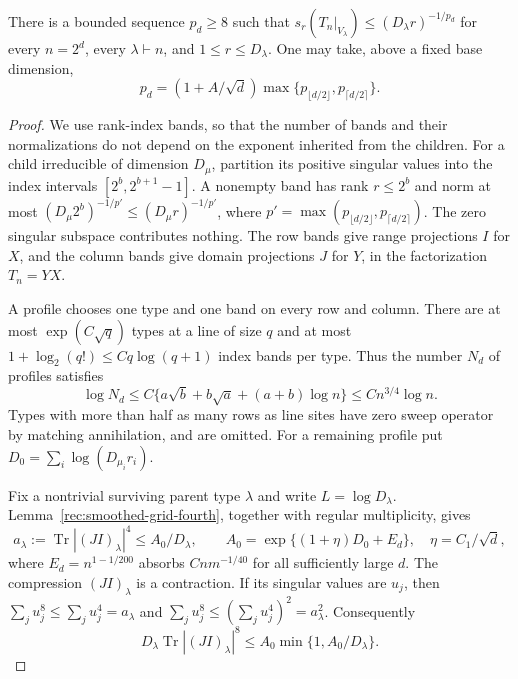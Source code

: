 \begin{theorem}\label{rec:smoothed-singular}
There is a bounded sequence $p_d\ge8$ such that
$s_r(T_n|_{V_\lambda})\le(D_\lambda r)^{-1/p_d}$ for every
$n=2^d$, every $\lambda\vdash n$, and $1\le r\le D_\lambda$.
One may take, above a fixed base dimension,
\[
 p_d=(1+A/\sqrt d)\max\{p_{\lfloor d/2\rfloor},
                              p_{\lceil d/2\rceil}\}.
\]
\end{theorem}
\begin{proof}
We use rank-index bands, so that the number of bands and their
normalizations do not depend on the exponent inherited from the
children. For a child irreducible of dimension $D_\mu$, partition
its positive singular values into the index intervals
$[2^b,2^{b+1}-1]$. A nonempty band has rank $r\le2^b$ and norm at
most $(D_\mu2^b)^{-1/p'}\le(D_\mu r)^{-1/p'}$, where
$p'=\max(p_{\lfloor d/2\rfloor},p_{\lceil d/2\rceil})$.
The zero singular subspace contributes nothing. The row bands give
range projections $I$ for $X$, and the column bands give domain
projections $J$ for $Y$, in the factorization $T_n=YX$.

A profile chooses one type and one band on every row and column.
There are at most $\exp(C\sqrt q)$ types at a line of size $q$
and at most $1+\log_2(q!)\le Cq\log(q+1)$ index bands per type.
Thus the number $N_d$ of profiles satisfies
\begin{equation}\label{rec:smoothed-profile-count}
 \log N_d\le C\{a\sqrt b+b\sqrt a+(a+b)\log n\}
 \le Cn^{3/4}\log n.
\end{equation}
Types with more than half as many rows as line sites have zero
sweep operator by matching annihilation, and are omitted. For a
remaining profile put $D_0=\sum_i\log(D_{\mu_i}r_i)$.

Fix a nontrivial surviving parent type $\lambda$ and write
$L=\log D_\lambda$. Lemma~\ref{rec:smoothed-grid-fourth}, together
with regular multiplicity, gives
\[
 a_\lambda:=\operatorname{Tr}|(JI)_\lambda|^4
 \le A_0/D_\lambda,\qquad
 A_0=\exp\{(1+\eta)D_0+E_d\},\quad
 \eta=C_1/\sqrt d,
\]
where $E_d=n^{1-1/200}$ absorbs $Cn m^{-1/40}$ for all sufficiently
large $d$. The compression $(JI)_\lambda$ is a contraction. If its
singular values are $u_j$, then
$\sum_j u_j^8\le\sum_j u_j^4=a_\lambda$ and
$\sum_j u_j^8\le(\sum_j u_j^4)^2=a_\lambda^2$. Consequently
\begin{equation}\label{rec:smoothed-eighth}
 D_\lambda\operatorname{Tr}|(JI)_\lambda|^8
 \le A_0\min\{1,A_0/D_\lambda\}.
\end{equation}


\end{proof}
